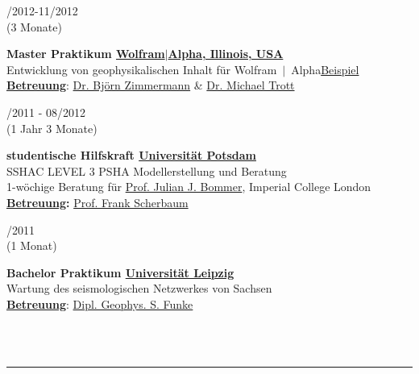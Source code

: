 \documentclass{article}
\newcommand{\spacingWork}{0.25cm}
\newcommand{\minipageSmall}{0.19}
\newcommand{\minipageBig}{0.78}
\begin{document}
\begin{minipage}[t]{0.70\textwidth}
	\vspace{\spacingWork}

	\begin{minipage}[t]{\minipageSmall\textwidth}
		/2012-11/2012 \\(3 Monate)
	\end{minipage}
	\hfill
	\begin{minipage}[t]{\minipageBig\textwidth}
		\textbf{Master Praktikum\hfill
		\href{https:///www.wolframalpha.com/}{\color{pblue}Wolfram$\mid$Alpha, Illinois, USA}}\\
		Entwicklung von geophysikalischen Inhalt für Wolfram$~\mid~$Alpha\hfill \href{https://m.wolframalpha.com/input/?i=moment+magnitude}{\color{pblue}Beispiel}\\
		\textbf{\underline{Betreuung}}: \href{mailto:bjornz@wolfram.com }{\color{pblue}Dr. Björn Zimmermann} \&	\href{mailto:mtrott@wolfram.com }{\color{pblue} Dr. Michael Trott}
	\end{minipage}

	\vspace{\spacingWork}

	\begin{minipage}[t]{\minipageSmall\textwidth}
		/2011 - 08/2012\\(1 Jahr 3 Monate)
	\end{minipage}
	\hfill
	\begin{minipage}[t]{\minipageBig\textwidth}
		\textbf{studentische Hilfskraft\hfill
		\href{https://www.uni-potsdam.de/}{\color{pblue}Universität Potsdam}}\\
		SSHAC LEVEL 3 PSHA Modellerstellung und Beratung\\
		1-wöchige Beratung für \href{https://www.imperial.ac.uk/people/j.bommer}{\color{pblue}Prof. Julian J. Bommer}, Imperial College London\\
		\textbf{\underline{Betreuung}:} \href{http://www.geo.uni-potsdam.de/mitarbeiterdetails/show/96/Frank_Scherbaum.html/}{\color{pblue}Prof. Frank Scherbaum}
	\end{minipage}

	\vspace{\spacingWork}

	\begin{minipage}[t]{\minipageSmall\textwidth}
		/2011\\(1 Monat)
	\end{minipage}
	\hfill
	\begin{minipage}[t]{\minipageBig\textwidth}
		\textbf{Bachelor Praktikum\hfill
		\href{http://geologie.physgeo.uni-leipzig.de}{\color{pblue}Universität Leipzig}}\\
		Wartung des seismologischen Netzwerkes von Sachsen\\
		\textbf{\underline{Betreuung}}: \href{mailto:sfunke@rz.uni-leipzig.de}{\color{pblue}Dipl. Geophys. S. Funke}
	\end{minipage}\\\\
	\hrule

\end{minipage}
\end{document}
